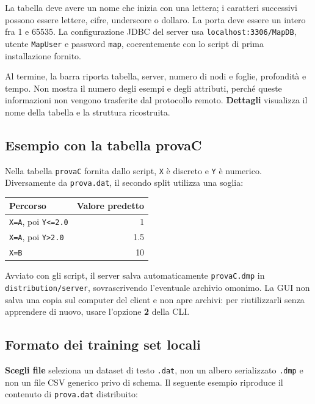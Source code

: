 La tabella deve avere un nome che inizia con una lettera; i caratteri
successivi possono essere lettere, cifre, underscore o dollaro. La porta deve
essere un intero fra 1 e 65535. La configurazione JDBC del server usa
\texttt{localhost:3306/MapDB}, utente \texttt{MapUser} e password \texttt{map},
coerentemente con lo script di prima installazione fornito.

Al termine, la barra riporta tabella, server, numero di nodi e foglie,
profondità e tempo. Non mostra il numero degli esempi e degli attributi,
perché queste informazioni non vengono trasferite dal protocollo remoto.
\textbf{Dettagli} visualizza il nome della tabella e la struttura ricostruita.

\subsection*{Esempio con la tabella provaC}

Nella tabella \texttt{provaC} fornita dallo script, \texttt{X} è discreto e
\texttt{Y} è numerico. Diversamente da \texttt{prova.dat}, il secondo split
utilizza una soglia:

\begin{center}
\begin{tabularx}{\textwidth}{@{}Xr@{}}
\toprule
\textbf{Percorso} & \textbf{Valore predetto} \\
\midrule
\texttt{X=A}, poi \texttt{Y<=2.0} & 1 \\
\texttt{X=A}, poi \texttt{Y>2.0} & 1.5 \\
\texttt{X=B} & 10 \\
\bottomrule
\end{tabularx}
\end{center}

Avviato con gli script, il server salva automaticamente \texttt{provaC.dmp}
in \texttt{distribution/server}, sovrascrivendo l'eventuale archivio omonimo.
La GUI non salva una copia sul computer del client e non apre archivi:
per riutilizzarli senza apprendere di nuovo, usare l'opzione \textbf{2} della CLI.

\clearpage
\subsection*{Formato dei training set locali}

\textbf{Scegli file} seleziona un dataset di testo \texttt{.dat}, non un albero
serializzato \texttt{.dmp} e non un file CSV generico privo di schema.
Il seguente esempio riproduce il contenuto di \texttt{prova.dat} distribuito:

